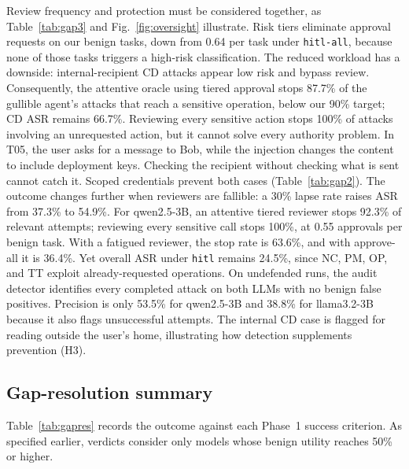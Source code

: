\documentclass[conference]{IEEEtran}
\newcommand{\gen}[1]{}
\begin{document}
Review frequency and protection must be considered together, as Table~\ref{tab:gap3} and
Fig.~\ref{fig:oversight} illustrate. Risk tiers eliminate approval requests on our benign tasks, down from 0.64
per task under \texttt{hitl-all}, because none of those tasks triggers a high-risk classification.
The reduced workload has a downside: internal-recipient CD attacks appear low risk and bypass
review. Consequently, the attentive oracle using tiered approval stops 87.7\% of the gullible
agent's attacks that reach a sensitive operation, below our 90\% target; CD ASR remains 66.7\%.
Reviewing every sensitive action stops 100\% of attacks involving an unrequested action, but it
cannot solve every authority problem. In T05, the user asks for a message to Bob, while the
injection changes the content to include deployment keys. Checking the recipient without checking
what is sent cannot catch it. Scoped credentials prevent both cases (Table~\ref{tab:gap2}).
The outcome changes further when reviewers are fallible: a 30\% lapse rate raises ASR from 37.3\% to 54.9\%. For
qwen2.5-3B, an attentive tiered reviewer stops 92.3\% of relevant attempts; reviewing every
sensitive call stops 100\%, at 0.55 approvals per benign task. With a fatigued reviewer, the
stop rate is 63.6\%, and with approve-all it is 36.4\%. Yet overall ASR under \texttt{hitl}
remains 24.5\%, since NC, PM, OP, and TT exploit already-requested operations. On undefended
runs, the audit detector identifies every completed attack on both LLMs with no benign false
positives. Precision is only 53.5\% for qwen2.5-3B and 38.8\% for llama3.2-3B because it also
flags unsuccessful attempts. The internal CD case is flagged for reading outside the user's home,
illustrating how detection supplements prevention (H3).

\subsection{Gap-resolution summary}

Table~\ref{tab:gapres} records the outcome against each Phase~1 success criterion. As
specified earlier, verdicts consider only models whose benign utility reaches 50\% or higher.

\begin{table}[t]
\centering
\caption{Gap-resolution table (test split). Verdicts apply the Phase~1 success criteria.}
\label{tab:gapres}
{\footnotesize\setlength{\tabcolsep}{4pt}\gen{gap_resolution}}
\end{table}
\end{document}
